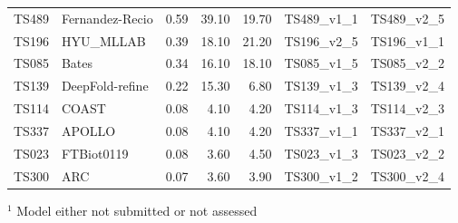 \begin{table}[ht]
{\begin{tabular}{llrrrll}
TS489 & Fernandez-Recio & 0.59 & 39.10 & 19.70 & TS489\_v1\_1 & TS489\_v2\_5 \\ 
TS196 & HYU\_MLLAB & 0.39 & 18.10 & 21.20 & TS196\_v2\_5 & TS196\_v1\_1 \\ 
TS085 & Bates & 0.34 & 16.10 & 18.10 & TS085\_v1\_5 & TS085\_v2\_2 \\ 
TS139 & DeepFold-refine & 0.22 & 15.30 & 6.80 & TS139\_v1\_3 & TS139\_v2\_4 \\ 
TS114 & COAST & 0.08 & 4.10 & 4.20 & TS114\_v1\_3 & TS114\_v2\_3 \\ 
TS337 & APOLLO & 0.08 & 4.10 & 4.20 & TS337\_v1\_1 & TS337\_v2\_1 \\ 
TS023 & FTBiot0119 & 0.08 & 3.60 & 4.50 & TS023\_v1\_3 & TS023\_v2\_2 \\ 
TS300 & ARC & 0.07 & 3.60 & 3.90 & TS300\_v1\_2 & TS300\_v2\_4 \\ 
\bottomrule
\end{tabular}%
}
\begin{flushleft}\footnotesize $^{1}$ Model either not submitted or not assessed\end{flushleft}
\end{table}
